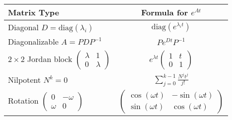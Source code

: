 \documentclass[12pt]{article}
\begin{document}
\begin{center}
\begin{tabular}{|l|c|}
\hline
\textbf{Matrix Type} & \textbf{Formula for $e^{At}$} \\
\hline
Diagonal $D = \text{diag}(\lambda_{i})$ & $\text{diag}(e^{\lambda_{i} t})$ \\
\hline
Diagonalizable $A = PDP^{-1}$ & $Pe^{Dt}P^{-1}$ \\
\hline
$2\times 2$ Jordan block $\begin{pmatrix} \lambda & 1 \\ 0 & \lambda \end{pmatrix}$ & $e^{\lambda t}\begin{pmatrix} 1 & t \\ 0 & 1 \end{pmatrix}$ \\
\hline
Nilpotent $N^{k} = 0$ & $\sum_{j=0}^{k-1} \frac{N^{j} t^{j}}{j!}$ \\
\hline
Rotation $\begin{pmatrix} 0 & -\omega \\ \omega & 0 \end{pmatrix}$ & $\begin{pmatrix} \cos(\omega t) & -\sin(\omega t) \\ \sin(\omega t) & \cos(\omega t) \end{pmatrix}$ \\
\hline
\end{tabular}
\end{center}
\end{document}
